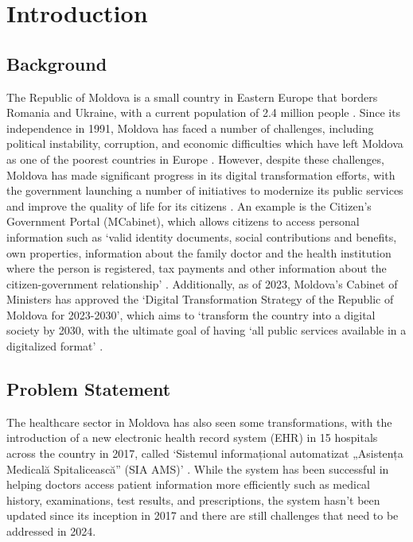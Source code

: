 \chapter{Introduction}
\label{chap:introduction}

\section{Background}

The Republic of Moldova is a small country in Eastern Europe that borders Romania and Ukraine, with a current population of 2.4 million people \parencite{mdpop}. Since its independence in 1991, Moldova has faced a number of challenges, including political instability, corruption, and economic difficulties which have left Moldova as one of the poorest countries in Europe \parencite{mdpoverty}. However, despite these challenges, Moldova has made significant progress in its digital transformation efforts, with the government launching a number of initiatives to modernize its public services and improve the quality of life for its citizens \parencite{mdega}. An example is the Citizen's Government Portal (MCabinet), which allows citizens to access personal information such as `valid identity documents, social contributions and benefits, own properties, information about the family doctor and the health institution where the person is registered, tax payments and other information about the citizen-government relationship' \parencite{mdcabinet}. Additionally, as of 2023, Moldova's Cabinet of Ministers has approved the `Digital Transformation Strategy of the Republic of Moldova for 2023-2030', which aims to `transform the country into a digital society by 2030, with the ultimate goal of having `all public services available in a digitalized format' \parencite{mdstrategy}.

\section{Problem Statement}

The healthcare sector in Moldova has also seen some transformations, with the introduction of a new electronic health record system (EHR) in 15 hospitals across the country in 2017, called `Sistemul informațional automatizat „Asistența Medicală Spitalicească” (SIA AMS)' \parencite{mdehr}. While the system has been successful in helping doctors access patient information more efficiently such as medical history, examinations, test results, and prescriptions, the system hasn't been updated since its inception in 2017 and there are still challenges that need to be addressed in 2024. 

